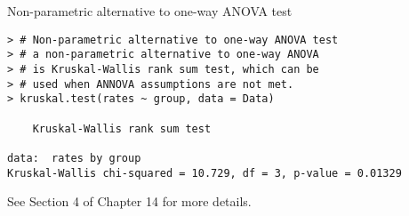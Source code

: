 \begin{frame}[fragile]{Non-parametric alternative to one-way ANOVA test}
	\begin{center}
	\begin{minipage}{0.7\textwidth}
\begin{lstlisting}
> # Non-parametric alternative to one-way ANOVA test
> # a non-parametric alternative to one-way ANOVA
> # is Kruskal-Wallis rank sum test, which can be
> # used when ANNOVA assumptions are not met.
> kruskal.test(rates ~ group, data = Data)

	Kruskal-Wallis rank sum test

data:  rates by group
Kruskal-Wallis chi-squared = 10.729, df = 3, p-value = 0.01329
\end{lstlisting}
	\end{minipage}
\vfill
{\small
	See Section 4 of Chapter 14 for more details.}
\end{center}
\end{frame}
